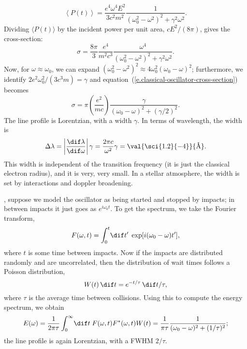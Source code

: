 \begin{sidebar}
\[
	\left\langle P(t)\right\rangle = \frac{e^{4}\omega^{4} E^{2}}{3 c^{2}m^{2}}
	\frac{1}{(\omega_{0}^{2}-\omega^{2})^{2} + \gamma^{2}\omega^{2}}.
\]
Dividing $\langle P(t)\rangle$ by the incident power per unit area, $cE^{2}/(8\pi)$, gives the cross-section:
\begin{equation}\label{e.classical-oscillator-cross-section}
	\sigma = \frac{8\pi}{3}\frac{e^{4}}{m^{2}c^{3}}
	\frac{\omega^{4}}{(\omega_{0}^{2}-\omega^{2})^{2} + \gamma^{2}\omega^{2}}.
\end{equation}
Now, for $\omega \approx \omega_{0}$, we can expand $(\omega_{0}^{2}-\omega^{2})^{2} \approx 4\omega_{0}^{2}(\omega_{0}-\omega)^{2}$; furthermore, we identify $2e^{2}\omega_{0}^{2}/(3c^{3}m) = \gamma$ and equation~(\ref{e.classical-oscillator-cross-section}) becomes
\begin{equation}\label{e.cross-section-lorentz}
	\sigma = \pi\left(\frac{e^{2}}{mc}\right)\frac{\gamma}{(\omega_{0}-\omega)^{2} + (\gamma/2)^{2}}.
\end{equation}
The line profile is Lorentzian, with a width $\gamma$. In terms of wavelength, the width is
\[ 
	\Delta \lambda = \left|\frac{\dif\lambda}{\dif\omega}\right|\gamma = \frac{2\pi c}{\omega^{2}}\gamma
	= \val{\sci{1.2}{-4}}{\textrm{\AA}}.
\]
This width is independent of the transition frequency (it is just the classical electron radius), and it is very, very small.  In a stellar atmosphere, the width is set by interactions and doppler broadening.

, suppose we model the oscillator as being started and stopped by impacts; in between impacts it just goes as $e^{i\omega_{0}t}$.  To get the spectrum, we take the Fourier transform,
\[
	F(\omega,t) = \int_{0}^{t}\!\dif t'\; \exp[i(\omega_{0}-\omega)t'],
\]
where $t$ is some time between impacts. Now if the impacts are distributed randomly and are uncorrelated, then the distribution of wait times follows a Poisson distribution,
\[ W(t)\,\dif t = e^{-t/\tau}\,\dif t/\tau, \]
where $\tau$ is the average time between collisions.  Using this to compute the energy spectrum, we obtain
\[ E(\omega) = \frac{1}{2\pi\tau}\int_{0}^{\infty}\!\dif t\; F(\omega,t)F^{*}(\omega,t)W(t) = \frac{1}{\pi\tau} 
	\frac{1}{(\omega_{0}-\omega)^{2} + (1/\tau)^{2}};
\]
the line profile is again Lorentzian, with a FWHM $2/\tau$.
\end{sidebar}


